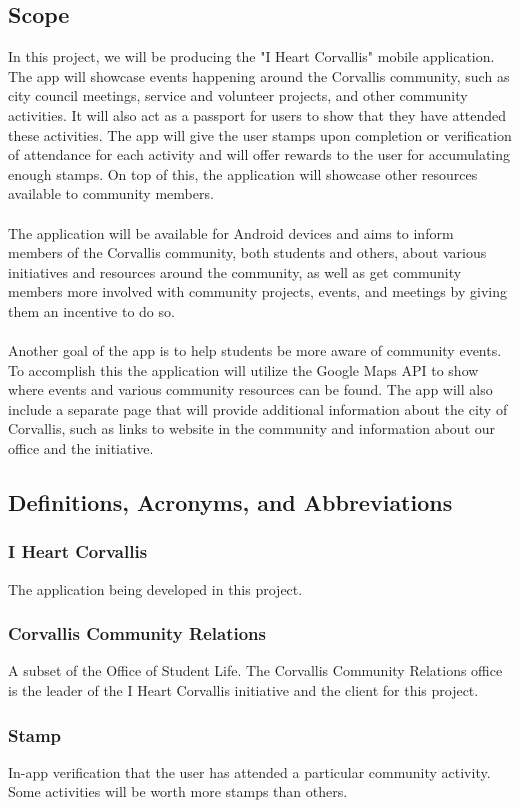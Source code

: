 \documentclass[draftclsnofoot, onecolumn, 10pt, compsoc]{IEEEtran}
\begin{document}
		\subsection{Scope}
			In this project, we will be producing the "I Heart Corvallis" mobile application. The app will showcase events happening around the Corvallis community, such as city council meetings, service and volunteer projects, and other community activities. It will also act as a passport for users to show that they have attended these activities. The app will give the user stamps upon completion or verification of attendance for each activity and will offer rewards to the user for accumulating enough stamps. On top of this, the application will showcase other resources available to community members. \\ \\
			The application will be available for Android devices and aims to inform members of the Corvallis community, both students and others, about various initiatives and resources around the community, as well as get community members more involved with community projects, events, and meetings by giving them an incentive to do so. \\ \\
			Another goal of the app is to help students be more aware of community events.  To accomplish this  the application will utilize the Google Maps API to show where events and various community resources can be found. The app will also include a separate page that will provide additional information about the city of Corvallis, such as links to website in the community and information about our office and the initiative.
			
		\subsection{Definitions, Acronyms, and Abbreviations}
			\subsubsection{I Heart Corvallis} The application being developed in this project.
			\subsubsection{Corvallis Community Relations} A subset of the Office of Student Life. The Corvallis Community Relations office is the leader of the I Heart Corvallis initiative and the client for this project.
			\subsubsection{Stamp} In-app verification that the user has attended a particular community activity. Some activities will be worth more stamps than others.
\end{document}
